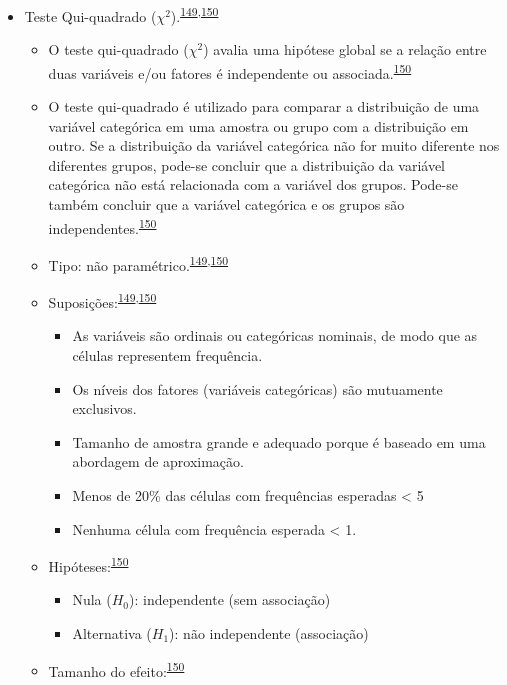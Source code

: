 \documentclass[
  a4paper,
]{book}
\begin{document}
\begin{itemize}
\item
  Teste Qui-quadrado (\(\chi^2\)).\textsuperscript{\protect\hyperlink{ref-McHugh2013}{149},\protect\hyperlink{ref-Kim2017a}{150}}

  \begin{itemize}
  \item
    O teste qui-quadrado (\(\chi^2\)) avalia uma hipótese global se a relação entre duas variáveis e/ou fatores é independente ou associada.\textsuperscript{\protect\hyperlink{ref-Kim2017a}{150}}
  \item
    O teste qui-quadrado é utilizado para comparar a distribuição de uma variável categórica em uma amostra ou grupo com a distribuição em outro. Se a distribuição da variável categórica não for muito diferente nos diferentes grupos, pode-se concluir que a distribuição da variável categórica não está relacionada com a variável dos grupos. Pode-se também concluir que a variável categórica e os grupos são independentes.\textsuperscript{\protect\hyperlink{ref-Kim2017a}{150}}
  \item
    Tipo: não paramétrico.\textsuperscript{\protect\hyperlink{ref-McHugh2013}{149},\protect\hyperlink{ref-Kim2017a}{150}}
  \item
    Suposições:\textsuperscript{\protect\hyperlink{ref-McHugh2013}{149},\protect\hyperlink{ref-Kim2017a}{150}}

    \begin{itemize}
    \item
      As variáveis são ordinais ou categóricas nominais, de modo que as células representem frequência.
    \item
      Os níveis dos fatores (variáveis categóricas) são mutuamente exclusivos.
    \item
      Tamanho de amostra grande e adequado porque é baseado em uma abordagem de aproximação.
    \item
      Menos de 20\% das células com frequências esperadas \textless{} 5
    \item
      Nenhuma célula com frequência esperada \textless{} 1.
    \end{itemize}
  \item
    Hipóteses:\textsuperscript{\protect\hyperlink{ref-Kim2017a}{150}}

    \begin{itemize}
    \item
      Nula (\(H_{0}\)): independente (sem associação)
    \item
      Alternativa (\(H_{1}\)): não independente (associação)
    \end{itemize}
  \item
    Tamanho do efeito:\textsuperscript{\protect\hyperlink{ref-Kim2017a}{150}}


\end{itemize}
\end{itemize}
\end{document}
